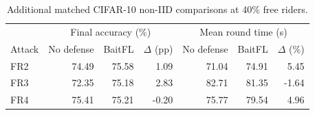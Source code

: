 \begin{table}[t]\centering\footnotesize
\caption{Additional matched CIFAR-10 non-IID comparisons at 40\% free riders.}\label{tab:baseline-extra}
\begin{tabular}{lrrrrrr}\toprule
 & \multicolumn{3}{c}{Final accuracy (\%)} & \multicolumn{3}{c}{Mean round time (s)} \\
Attack & No defense & BaitFL & $\Delta$ (pp) & No defense & BaitFL & $\Delta$ (\%) \\ \midrule
FR2 & 74.49 & 75.58 & 1.09 & 71.04 & 74.91 & 5.45 \\
FR3 & 72.35 & 75.18 & 2.83 & 82.71 & 81.35 & -1.64 \\
FR4 & 75.41 & 75.21 & -0.20 & 75.77 & 79.54 & 4.96 \\
\bottomrule\end{tabular}\end{table}
